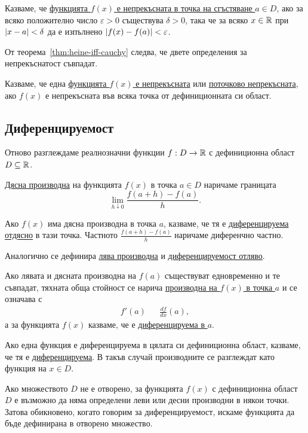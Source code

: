 \documentclass[numbers=endperiod, DIV=15, bibliography=totocnumbered]{scrartcl}
\begin{document}
\begin{definition}
  Казваме, че \uline{функцията $f(x)$ е непрекъсната в точка на сгъстяване $a \in D$}, ако за всяко положително число $\varepsilon > 0$ съществува $\delta > 0$, така че за всяко $x \in \mathbb{R}$ при $\left\vert x - a \right\vert < \delta$ да е изпълнено $\left\vert f(x) - f(a) \right\vert < \varepsilon$.
\end{definition}

\begin{note}
  От теорема~\ref{thm:heine-iff-cauchy} следва, че двете определения за непрекъснатост съвпадат.
\end{note}

\begin{definition}
  Казваме, че една \uline{функцията $f(x)$ е непрекъсната} или \uline{поточково непрекъсната}, ако $f(x)$ е непрекъсната във всяка точка от дефиниционната си област.
\end{definition}

\subsection{Диференцируемост}

Отново разглеждаме реалнозначни функции $f: D \to \mathbb{R}$ с дефиниционна област $D \subseteq \mathbb{R}$.

\begin{definition}
  \uline{Дясна производна} на функцията $f(x)$ в точка $a \in D$ наричаме границата
  \begin{displaymath}
    \lim_{h \downarrow 0} \frac {f(a + h) - f(a)} h.
  \end{displaymath}

  Ако $f(x)$ има дясна производна в точка $a$, казваме, че тя е \uline{диференцируема отдясно} в тази точка.
  Частното $\frac {f(a + h) - f(a)} h$ наричаме диференчно частно.

  Аналогично се дефинира \uline{лява производна} и \uline{диференцируемост отляво}.

  Ако лявата и дясната производна на $f(a)$ съществуват едновременно и те съвпадат, тяхната обща стойност се нарича \uline{производна на $f(x)$ в точка $a$} и се означава с
  \begin{align*}
    f'(a)
    &&
    \frac {df} {dx} (a),
  \end{align*}
  а за функцията $f(x)$ казваме, че е \uline{диференцируема в $a$}.

  Ако една функция е диференцируема в цялата си дефиниционна област, казваме, че тя е \uline{диференцируема}. В такъв случай производните се разглеждат като функция на $x \in D$.
\end{definition}

\begin{note}
  Ако множеството $D$ не е отворено, за функцията $f(x)$ с дефиниционна област $D$ е възможно да няма определени леви или десни производни в някои точки. Затова обикновено, когато говорим за диференцируемост, искаме функцията да бъде дефинирана в отворено множество.
\end{note}

\printbibliography
\end{document}

